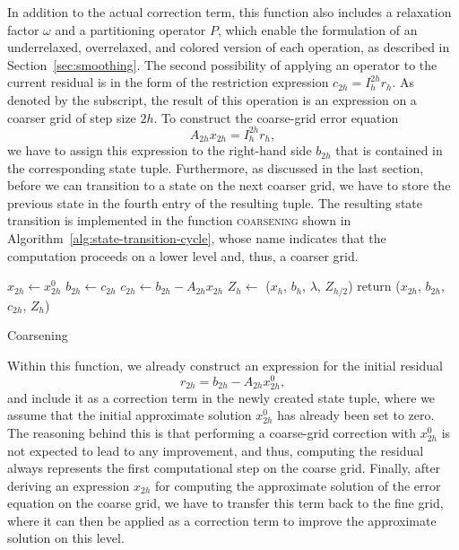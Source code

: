 In addition to the actual correction term, this function also includes a relaxation factor $\omega$ and a partitioning operator $P$, which enable the formulation of an underrelaxed, overrelaxed, and colored version of each operation, as described in Section~\ref{sec:smoothing}.
The second possibility of applying an operator to the current residual is in the form of the restriction expression $c_{2h} = I_{h}^{2h} r_h$.
As denoted by the subscript, the result of this operation is an expression on a coarser grid of step size $2h$.
To construct the coarse-grid error equation 
\begin{equation*}
A_{2h} x_{2h} = I_{h}^{2h} r_h,
\end{equation*} 
we have to assign this expression to the right-hand side $b_{2h}$ that is contained in the corresponding state tuple.
Furthermore, as discussed in the last section, before we can transition to a state on the next coarser grid, we have to store the previous state in the fourth entry of the resulting tuple.
The resulting state transition is implemented in the function \textsc{coarsening} shown in Algorithm~\ref{alg:state-transition-cycle}, whose name indicates that the computation proceeds on a lower level and, thus, a coarser grid.
\begin{algorithm}
	\begin{algorithmic}
		\State $x_{2h} \gets x_{2h}^0$ 
		\State $b_{2h} \gets c_{2h}$
		\State $c_{2h} \gets b_{2h} - A_{2h} x_{2h}$ 
		\State $Z_h \gets$ ($x_{h}$, $b_{h}$, $\lambda$, $Z_{h/2}$)
		\State return ($x_{2h}$, $b_{2h}$, $c_{2h}$, $Z_h$)
	\EndFunction
	\end{algorithmic}
 \caption{Coarsening}
\label{alg:state-transition-cycle}
\end{algorithm}
Within this function, we already construct an expression for the initial residual
\begin{equation*}
	r_{2h} = b_{2h} - A_{2h} x_{2h}^0,
\end{equation*} 
and include it as a correction term in the newly created state tuple, where we assume that the initial approximate solution $x^0_{2h}$ has already been set to zero.
The reasoning behind this is that performing a coarse-grid correction with $x^0_{2h}$ is not expected to lead to any improvement, and thus, computing the residual always represents the first computational step on the coarse grid.
Finally, after deriving an expression $x_{2h}$ for computing the approximate solution of the error equation on the coarse grid, we have to transfer this term back to the fine grid, where it can then be applied as a correction term to improve the approximate solution on this level.
